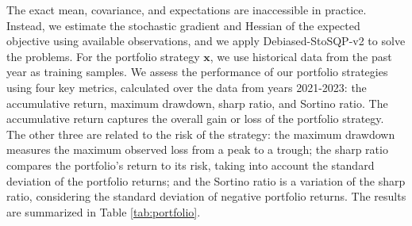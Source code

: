 \documentclass[aos]{imsart}
\numberwithin{equation}{section}
\theoremstyle{plain}
\begin{document}
\begin{table}[h]
  \centering
  \caption{Fama-French 100 Portfolios DataSet, 2021-2023}
\label{tab:portfolio}
\end{table}



The exact mean, covariance, and expectations are inaccessible in practice. Instead, we estimate the stochastic gradient and Hessian of the expected objective using available observations, and we apply Debiased-StoSQP-v2 to solve the problems. For the portfolio strategy $\bm{x}$, we use historical data from the past year as training samples. 
We assess the performance of our portfolio strategies using four key metrics, calculated over the data from years 2021-2023: the accumulative return, maximum drawdown, sharp ratio, and Sortino ratio. The accumulative return captures the overall gain or loss of the portfolio strategy. The other three are related to the risk of the strategy: the maximum drawdown measures the maximum observed loss from a peak to a trough; the sharp ratio compares the portfolio's return to its risk, taking into account the standard deviation of the portfolio returns; and the Sortino ratio is a variation of the sharp ratio, considering the standard deviation of negative portfolio returns. The results are summarized in Table \ref{tab:portfolio}. 
\end{document}

